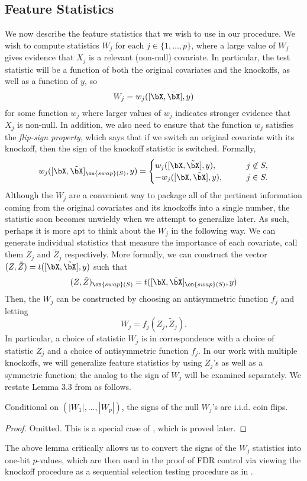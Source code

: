 \subsection{Feature Statistics}
We now describe the feature statistics that we wish to use in our procedure. We wish to compute statistics $W_j$ for each $j \in \{ 1, \ldots, p \}$, where a large value of $W_j$ gives evidence that $X_j$ is a relevant (non-null) covariate. In particular, the test statistic will be a function of both the original covariates and the knockoffs, as well as a function of $y$, so
\[ W_j = w_j([\bX, \tilde{\bX}], y) \] for some function $w_j$ where larger values of $w_j$ indicates stronger evidence that $X_j$ is non-null. In addition, we also need to ensure that the function $w_j$ satisfies the \emph{flip-sign property}, which says that if we switch an original covariate with its knockoff, then the sign of the knockoff statistic is switched. Formally,
\[ w_j([\bX, \tilde{\bX}]_{\on{swap}(S)}, y) = \begin{cases}
w_j([\bX, \tilde{\bX}], y), \qquad & j \not \in S, \\
-w_j([\bX, \tilde{\bX}], y), \qquad & j \in S.
\end{cases}\]
Although the $W_j$ are a convenient way to package all of the pertinent information coming from the original covariates and its knockoffs into a single number, the statistic soon becomes unwieldy when we attempt to generalize later. As such, perhaps it is more apt to think about the $W_j$ in the following way. We can generate individual statistics that measure the importance of each covariate, call them $Z_j$ and $\tilde{Z}_j$ respectively. More formally, we can construct the vector $(Z, \tilde{Z}) = t([\bX, \tilde{\bX}], y)$ such that
\[ (Z, \tilde{Z})_{\on{swap}(S)} = t([\bX, \tilde{\bX}]_{\on{swap}(S)}, y) \] Then, the $W_j$ can be constructed by choosing an antisymmetric function $f_j$ and letting
\[ W_j = f_j(Z_j, \tilde{Z}_j). \] In particular, a choice of statistic $W_j$ is in correspondence with a choice of statistic $Z_j$ and a choice of antisymmetric function $f_j$. In our work with multiple knockoffs, we will generalize feature statistics by using $Z_j$'s as well as a symmetric function; the analog to the sign of $W_j$ will be examined separately. We restate Lemma 3.3 from \cite{panning}
 as follows.
\begin{lem}
Conditional on $(|W_1|, \ldots, |W_p|)$, the signs of the null $W_j$'s are i.i.d. coin flips. 
\end{lem}
\begin{proof}
Omitted. This is a special case of , which is proved later.
\end{proof}
The above lemma critically allows us to convert the signs of the $W_j$ statistics into one-bit $p$-values, which are then used in the proof of FDR control via viewing the knockoff procedure as a sequential selection testing procedure as in \cite{knockoffs}. 

